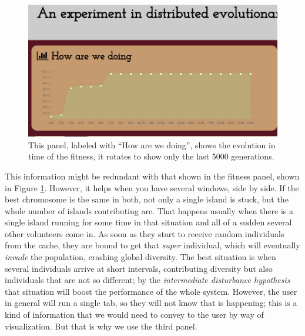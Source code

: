 \documentclass{sig-alternate}
\begin{document}
\begin{figure}[!htb]
\centering
\includegraphics[width=0.95\linewidth]{fitness.png}
\caption{This panel, labeled with ``How are we doing'', shows
  the evolution in time of the fitness, it rotates to show only the
  last 5000 generations.  \label{fig:fitness}}
\end{figure}
%
This information might be redundant with that shown in the fitness
panel, shown in Figure \ref{fig:fitness}. However, it helps when you
have several windows, side by side. If the best chromosome is the same
in both, not only a single island is stuck, but the whole number of
islands contributing are. That happens usually when there is a single
island running for some time in that situation and all of a sudden
several other volunteers come in. As soon as they start to receive
random individuals from the cache, they are bound to get that {\em
  super} individual, which will eventually {\em invade} the
population, crashing global diversity. The best situation is when
several individuals arrive at short intervals, contributing diversity
but also individuals that are not so different; by the {\em
  intermediate disturbance hypothesis} \cite{jj:2008:PPSN} that
situation will boost the performance of the whole system. However, the
user in general will run a single tab, so they will not know that is
happening; this is a kind of information that we would need to convey
to the user by way of visualization. But that is why we use the third
panel. 
\end{document}
